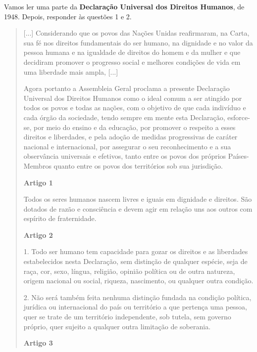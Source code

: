 \begin{itemize}
\begin{itemize}
\begin{itemize}
\begin{itemize}
{{\begin{itemize}
{}


Vamos ler uma parte da \textbf{Declaração Universal dos Direitos Humanos}, de 1948. Depois, responder às questões 1 e 2.

\begin{quote}
[...]
Considerando que os povos das Nações Unidas reafirmaram, na Carta, sua
fé nos direitos fundamentais do ser humano, na dignidade e no valor da
pessoa humana e na igualdade de direitos do homem e da mulher e que
decidiram promover o progresso social e melhores condições de vida em
uma liberdade mais ampla, [...]

Agora portanto a Assembleia Geral proclama a presente Declaração
Universal dos Direitos Humanos como o ideal comum a ser atingido por
todos os povos e todas as nações, com o objetivo de que cada indivíduo e
cada órgão da sociedade, tendo sempre em mente esta Declaração,
esforce-se, por meio do ensino e da educação, por promover o respeito a
esses direitos e liberdades, e pela adoção de medidas progressivas de
caráter nacional e internacional, por assegurar o seu reconhecimento e a
sua observância universais e efetivos, tanto entre os povos dos próprios
Países-Membros quanto entre os povos dos territórios sob sua jurisdição.

\textbf{Artigo 1}

Todos os seres humanos nascem livres e iguais em dignidade e direitos.
São dotados de razão e consciência e devem agir em relação uns aos
outros com espírito de fraternidade.

\textbf{Artigo 2}

1. Todo ser humano tem capacidade para gozar os direitos e as liberdades
estabelecidos nesta Declaração, sem distinção de qualquer espécie, seja
de raça, cor, sexo, língua, religião, opinião política ou de outra
natureza, origem nacional ou social, riqueza, nascimento, ou qualquer
outra condição.

2. Não será também feita nenhuma distinção fundada na condição política,
jurídica ou internacional do país ou território a que pertença uma
pessoa, quer se trate de um território independente, sob tutela, sem
governo próprio, quer sujeito a qualquer outra limitação de soberania.

\textbf{Artigo 3}


\end{quote}
\end{itemize}}}
\end{itemize}
\end{itemize}
\end{itemize}
\end{itemize}
